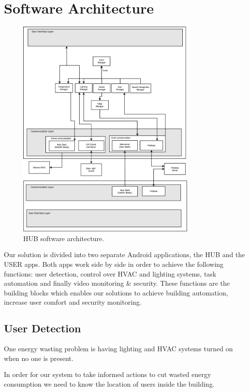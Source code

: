 \section{Software Architecture}


\begin{figure}[H]
\centering
\includegraphics[width=0.8\textwidth]{Figures/software_dia}
\caption{HUB software architecture.}
\label{screen_lights}
\end{figure}


Our solution is divided into two separate Android applications, the HUB and the USER apps. Both apps work side by side in order to achieve the following functions: user detection, control over \ac{HVAC} and lighting systems, task automation and finally video monitoring \& security. These functions are the building blocks which enables our solutions to achieve building automation, increase user comfort and security monitoring.


\subsection{User Detection}\label{user_detection_imp}

One energy wasting problem is having lighting and \ac{HVAC} systems turned on when no one is present.


In order for our system to take informed actions to cut wasted energy consumption we need to know the location of users inside the building.



